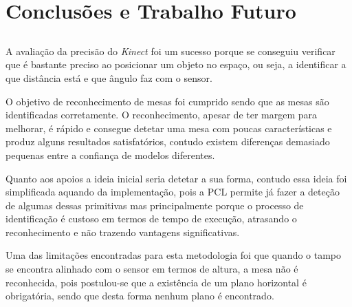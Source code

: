 \chapter{Conclusões e Trabalho Futuro} \label{chap:concl}

\section*{}




A avaliação da precisão do \emph{Kinect} foi um sucesso porque se conseguiu verificar que é bastante preciso ao posicionar um objeto no espaço, ou seja, a identificar a que distância está e que ângulo faz com o sensor.

O objetivo de reconhecimento de mesas foi cumprido sendo que as mesas são identificadas corretamente. O reconhecimento, apesar de ter margem para melhorar, é rápido e consegue detetar uma mesa com poucas características e produz alguns resultados satisfatórios, contudo existem diferenças demasiado pequenas entre a confiança de modelos diferentes.

Quanto aos apoios a ideia inicial seria detetar a sua forma, contudo essa ideia foi simplificada aquando da implementação, pois a PCL permite já fazer a deteção de algumas dessas primitivas mas principalmente porque o processo de identificação é custoso em termos de tempo de execução, atrasando o reconhecimento e não trazendo vantagens significativas.

Uma das limitações encontradas para esta metodologia foi que quando o tampo se encontra alinhado com o sensor em termos de altura, a mesa não é reconhecida, pois postulou-se que a existência de um plano horizontal é obrigatória, sendo que desta forma nenhum plano é encontrado.

